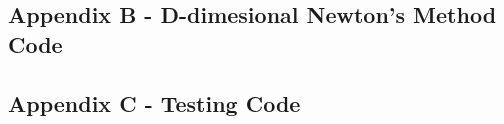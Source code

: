 \documentclass[10pt]{article}
\begin{document}
\pagebreak

\subsection*{Appendix B - D-dimesional Newton's Method Code}


\pagebreak

\subsection*{Appendix C - Testing Code}

\end{document}
